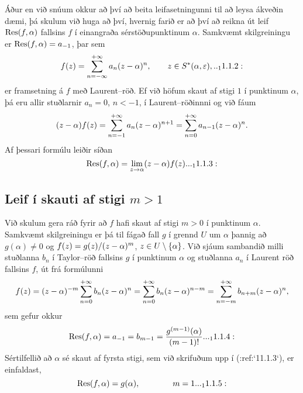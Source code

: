  {Á}ður en við snúum okkur að því að
beita leifasetningunni til að leysa ákveðin dæmi, 
þá skulum við huga að því, hvernig farið er að
því að reikna út leif  ${\operatorname{Res}}(f,\alpha)$ fallsins $f$ í einangraða
sérstöðupunktinum $\alpha$.  Samkvæmt skilgreiningu er
${\operatorname{Res}}(f,\alpha)=a_{-1}$, þar sem 
 \begin{equation*}f(z)=\sum\limits_{n=-\infty}\sp{+\infty}a_n(z-\alpha)\sp n, \qquad
z\in S^\ast(\alpha,\varepsilon),

.. _11.1.2:

 \end{equation*}
er framsetning á $f$ með Laurent--röð.  Ef við höfum skaut af stigi
$1$ í punktinum $\alpha$, þá eru allir stuðlarnir $a_n=0$, $n<-1$, í
Laurent--röðinnni og við fáum
 $$(z-\alpha)f(z)=\sum\limits_{n=-1}\sp{+\infty} a_n(z-\alpha)\sp{n+1} =
\sum\limits_{n=0}\sp{+\infty} a_{n-1}(z-\alpha)\sp{n}.
 $$
Af þessari formúlu leiðir síðan
 \begin{equation*}\Res(f,\alpha)=\lim_{z\to \alpha}(z-\alpha)f(z).

.. _11.1.3:

 \end{equation*}


\subsection*{Leif í skauti af stigi $m>1$}


Við skulum gera ráð fyrir að $f$ hafi
skaut af stigi $m>0$ í punktinum $\alpha$. Samkvæmt skilgreiningu er
þá til fágað fall $g$ í 
grennd $U$ um $\alpha$ þannig að $g(\alpha)\neq 0$ og
$f(z)=g(z)/(z-\alpha)\sp m$, $z\in 
U\setminus {\{\alpha\}}$.  Við sjáum sambandið milli stuðlanna
$b_n$ í Taylor--röð fallsins $g$ í punktinum $\alpha$ og stuðlanna
$a_n$ í Laurent röð fallsins $f$, út frá formúlunni
 $$f(z)=(z-\alpha)\sp{-m}\sum_{n=0}\sp{+\infty}b_n(z-\alpha)\sp n=
\sum_{n=0}\sp{+\infty}b_n(z-\alpha)\sp {n-m}=
\sum_{n=-m}\sp{+\infty}b_{n+m}(z-\alpha)\sp {n},
 $$
sem gefur okkur
 \begin{equation*}\Res(f,\alpha)=a_{-1}=b_{m-1}=\dfrac{g\sp{(m-1)}(\alpha)}{(m-1)!}.

.. _11.1.4:

 \end{equation*}
Sértilfellið að $\alpha$ sé skaut af fyrsta stigi, sem við skrifuðum
upp í  (:ref:`11.1.3`), er einfaldast, 
 \begin{equation*}\Res(f,\alpha)= g(\alpha), \qquad\qquad m=1.


.. _11.1.5:

 \end{equation*}

